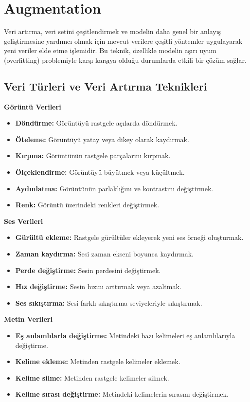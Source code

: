 \section{Augmentation}
Veri artırma, veri setini çeşitlendirmek ve modelin daha genel bir anlayış geliştirmesine yardımcı olmak için mevcut verilere çeşitli yöntemler uygulayarak yeni veriler elde etme işlemidir. Bu teknik, özellikle modelin aşırı uyum (overfitting) problemiyle karşı karşıya olduğu durumlarda etkili bir çözüm sağlar. 

\subsection{Veri Türleri ve Veri Artırma Teknikleri}
\textbf{Görüntü Verileri}
\begin{itemize}
    \item \textbf{Döndürme:} Görüntüyü rastgele açılarda döndürmek.
    \item \textbf{Öteleme:} Görüntüyü yatay veya dikey olarak kaydırmak.
    \item \textbf{Kırpma:} Görüntünün rastgele parçalarını kırpmak.
    \item \textbf{Ölçeklendirme:} Görüntüyü büyütmek veya küçültmek.
    \item \textbf{Aydınlatma:} Görüntünün parlaklığını ve kontrastını değiştirmek.
    \item \textbf{Renk:} Görüntü üzerindeki renkleri değiştirmek.
\end{itemize}

\textbf{Ses Verileri}
\begin{itemize}
    \item \textbf{Gürültü ekleme:} Rastgele gürültüler ekleyerek yeni ses örneği oluşturmak.
    \item \textbf{Zaman kaydırma:} Sesi zaman ekseni boyunca kaydırmak.
    \item \textbf{Perde değiştirme:} Sesin perdesini değiştirmek.
    \item \textbf{Hız değiştirme:} Sesin hızını arttırmak veya azaltmak.
    \item \textbf{Ses sıkıştırma:} Sesi farklı sıkıştırma seviyeleriyle sıkıştırmak.
\end{itemize}

\textbf{Metin Verileri}
\begin{itemize}
    \item \textbf{Eş anlamlılarla değiştirme:} Metindeki bazı kelimeleri eş anlamlılarıyla değiştirme.
    \item \textbf{Kelime ekleme:} Metinden rastgele kelimeler eklemek.
    \item \textbf{Kelime silme:} Metinden rastgele kelimeler silmek.
    \item \textbf{Kelime sırası değiştirme:} Metindeki kelimelerin sırasını değiştirmek.
\end{itemize}

